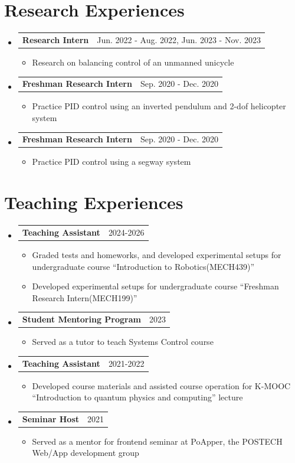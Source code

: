 \documentclass[letterpaper,11pt]{article}
\makeatletter
\newcommand{\resumeSubheadingtwo}[3]{
  \vspace{-1pt}\item[]
    \begin{tabular*}{0.97\textwidth}{l@{\extracolsep{\fill}}r}
      \textbf{#1}\text{ #2} & #3 \\
    \end{tabular*}\vspace{-5pt}
}
\newcommand{\resumeSubHeadingListStart}{\begin{itemize}[leftmargin=*]}
\newcommand{\resumeSubHeadingListEnd}{\end{itemize}}
\newcommand{\resumeItemListStart}{\begin{itemize}}
\newcommand{\resumeItemListEnd}{\end{itemize}\vspace{-5pt}}
\makeatother
\begin{document}
\section{Research Experiences}
  \resumeSubHeadingListStart
    \resumeSubheadingtwo
    {Research Intern}{(MARCH Lab, POSTECH)}{Jun. 2022 - Aug. 2022, Jun. 2023 - Nov. 2023}
    \resumeItemListStart
        \item{Research on balancing control of an unmanned unicycle}
      \resumeItemListEnd
    \resumeSubheadingtwo
    {Freshman Research Intern}{(Dept. of E.E, POSTECH)}{Sep. 2020 - Dec. 2020}
    \resumeItemListStart
        \item{Practice PID control using an inverted pendulum and 2-dof helicopter system}
      \resumeItemListEnd
    \resumeSubheadingtwo
    {Freshman Research Intern}{(Dept. of M.E, POSTECH)}{Sep. 2020 - Dec. 2020}
    \resumeItemListStart
        \item{Practice PID control using a segway system}
      \resumeItemListEnd
  \resumeSubHeadingListEnd


\section{Teaching Experiences}
  \resumeSubHeadingListStart
    \resumeSubheadingtwo
    {Teaching Assistant}{(Dept. of M.E., POSTECH)}{2024-2026}
    \resumeItemListStart
      \item{Graded tests and homeworks, and developed experimental setups for undergraduate course ``Introduction to Robotics(MECH439)''}
      \item{Developed experimental setups for undergraduate course ``Freshman Research Intern(MECH199)''}
    \resumeItemListEnd
    \resumeSubheadingtwo
    {Student Mentoring Program}{(Dept. of M.E., POSTECH)}{2023}
    \resumeItemListStart
        \item{Served as a tutor to teach Systems Control course}
      \resumeItemListEnd
    \resumeSubheadingtwo
    {Teaching Assistant}{(K-MOOC)}{2021-2022}
    \resumeItemListStart
        \item{Developed course materials and assisted course operation for K-MOOC ``Introduction to quantum physics and computing'' lecture}
      \resumeItemListEnd
    \resumeSubheadingtwo
    {Seminar Host}{(PoApper)}{2021}
    \resumeItemListStart
        \item{Served as a mentor for frontend seminar at PoApper, the POSTECH Web/App development group}
      \resumeItemListEnd
  \resumeSubHeadingListEnd
\end{document}
